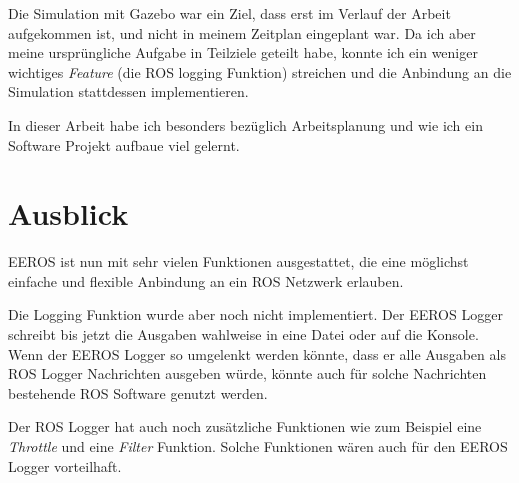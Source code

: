 Die Simulation mit Gazebo war ein Ziel, dass erst im Verlauf der Arbeit aufgekommen ist, und nicht in meinem Zeitplan eingeplant war.
Da ich aber meine ursprüngliche Aufgabe in Teilziele geteilt habe, konnte ich ein weniger wichtiges \textit{Feature} (die ROS logging Funktion) streichen und die Anbindung an die Simulation stattdessen implementieren.

In dieser Arbeit habe ich besonders bezüglich Arbeitsplanung und wie ich ein Software Projekt aufbaue viel gelernt.


\section{Ausblick}
EEROS ist nun mit sehr vielen Funktionen ausgestattet, die eine möglichst einfache und flexible Anbindung an ein ROS Netzwerk erlauben.

Die Logging Funktion wurde aber noch nicht implementiert.
Der EEROS Logger schreibt bis jetzt die Ausgaben wahlweise in eine Datei oder auf die Konsole.
Wenn der EEROS Logger so umgelenkt werden könnte, dass er alle Ausgaben als ROS Logger Nachrichten ausgeben würde, könnte auch für solche Nachrichten bestehende ROS Software genutzt werden.

Der ROS Logger hat auch noch zusätzliche Funktionen wie zum Beispiel eine \textit{Throttle} und eine \textit{Filter} Funktion.
Solche Funktionen wären auch für den EEROS Logger vorteilhaft.